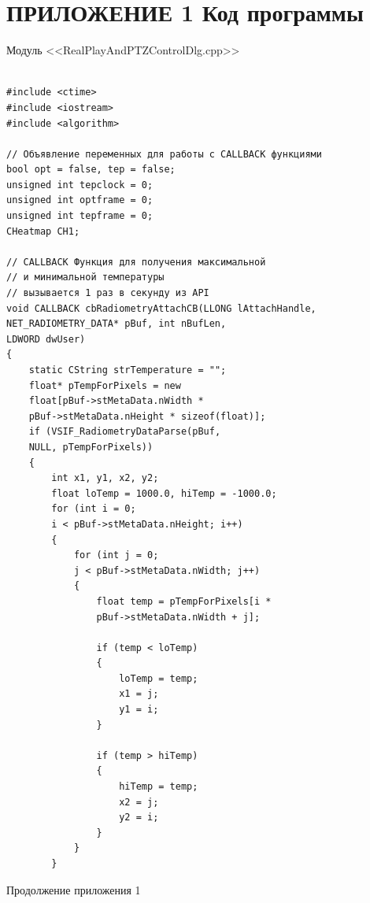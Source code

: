 \documentclass[14pt, a4paper]{extreport}
\begin{document}
\chapter*{ПРИЛОЖЕНИЕ 1 Код программы}
\begin{center} {Модуль <<RealPlayAndPTZControlDlg.cpp>>}
\end{center}
\begin{Verbatim}[fontseries=c, fontsize=\fontsize{10pt}{12pt}\selectfont]

#include <ctime>
#include <iostream>
#include <algorithm>

// Объявление переменных для работы с CALLBACK функциями
bool opt = false, tep = false;
unsigned int tepclock = 0;
unsigned int optframe = 0;
unsigned int tepframe = 0;
CHeatmap CH1;

// CALLBACK Функция для получения максимальной 
// и минимальной температуры
// вызывается 1 раз в секунду из API
void CALLBACK cbRadiometryAttachCB(LLONG lAttachHandle, 
NET_RADIOMETRY_DATA* pBuf, int nBufLen, 
LDWORD dwUser)
{
	static CString strTemperature = "";
	float* pTempForPixels = new 
	float[pBuf->stMetaData.nWidth * 
	pBuf->stMetaData.nHeight * sizeof(float)];
	if (VSIF_RadiometryDataParse(pBuf, 
	NULL, pTempForPixels))
	{
		int x1, y1, x2, y2;
		float loTemp = 1000.0, hiTemp = -1000.0;
		for (int i = 0; 
		i < pBuf->stMetaData.nHeight; i++)
		{
			for (int j = 0; 
			j < pBuf->stMetaData.nWidth; j++)
			{
				float temp = pTempForPixels[i * 
				pBuf->stMetaData.nWidth + j];
				
				if (temp < loTemp)
				{
					loTemp = temp;
					x1 = j;
					y1 = i;
				}
				
				if (temp > hiTemp)
				{
					hiTemp = temp;
					x2 = j;
					y2 = i;
				}
			}
		}
\end{Verbatim}
\noindent Продолжение приложения 1
\end{document}
